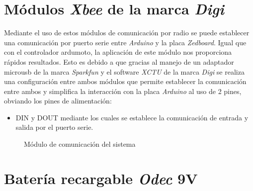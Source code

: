 \section{Módulos \emph{Xbee} de la marca \emph{Digi}}

Mediante el uso de estos módulos de comunicación por radio se puede establecer una comunicación por puerto serie entre \emph{Arduino} y la placa \emph{Zedboard}. Igual que con el controlador ardumoto, la aplicación de este módulo nos proporciona rápidos resultados. Esto es debido a que gracias al manejo de un adaptador microusb de la marca \emph{Sparkfun} y el software \emph{XCTU} de la marca \emph{Digi} se realiza una configuración entre ambos módulos que permite establecer la comunicación entre ambos y simplifica la interacción con la placa \emph{Arduino} al uso de 2 pines, obviando los pines de alimentación:

\begin{itemize}
\item DIN y DOUT mediante los cuales se establece la comunicación de entrada y salida por el puerto serie. 
\end{itemize}

\begin{figure}[htbp]
 \centering
 \caption{Módulo de comunicación del sistema}
 \label{fig:Xbee}
\end{figure}

\section{Batería recargable \emph{Odec} 9V}

